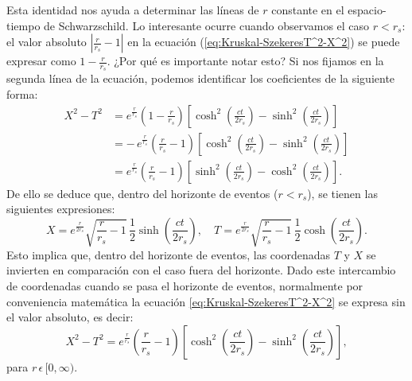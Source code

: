 \noindent
Esta identidad nos ayuda a determinar las líneas de \(r\) constante en el espacio-tiempo de Schwarzschild. Lo interesante ocurre cuando observamos el caso \(r < r_s\): el valor absoluto \(\left|\frac{r}{r_s}-1\right|\) en la ecuación (\ref{eq:Kruskal-SzekeresT^2-X^2}) se puede expresar como \(1-\frac{r}{r_s}\). ¿Por qué es importante notar esto? Si nos fijamos en la segunda línea de la ecuación, podemos identificar los coeficientes de la siguiente forma:
\begin{equation}
    \begin{aligned}
       X^2 -  T^2  &= e^{\frac{r}{r_s}} \left(1-\frac{r}{r_s}\right) \left[ \cosh^2\left(\frac{ct}{2r_s}\right) - \sinh^2\left(\frac{ct}{2r_s}\right) \right] \\
        &= -\, e^{\frac{r}{r_s}} \left(\frac{r}{r_s}-1\right) \left[ \cosh^2\left(\frac{ct}{2r_s}\right) - \sinh^2\left(\frac{ct}{2r_s}\right) \right] \\
        &= e^{\frac{r}{r_s}} \left(\frac{r}{r_s}-1\right) \left[ \sinh^2\left(\frac{ct}{2r_s}\right) - \cosh^2\left(\frac{ct}{2r_s}\right) \right].
    \end{aligned}
\end{equation}
De ello se deduce que, dentro del horizonte de eventos (\(r < r_s\)), se tienen las siguientes expresiones:
\begin{equation}
    X = e^{\frac{r}{2r_s}} \sqrt{\frac{r}{r_s}-1} \, \frac{1}{2} \sinh\left(\frac{ct}{2r_s}\right), \quad 
    T = e^{\frac{r}{2r_s}} \sqrt{\frac{r}{r_s}-1} \, \frac{1}{2} \cosh\left(\frac{ct}{2r_s}\right).
\end{equation}
Esto implica que, dentro del horizonte de eventos, las coordenadas \(T\) y \(X\) se invierten en comparación con el caso fuera del horizonte. Dado este intercambio de coordenadas cuando se pasa el horizonte de eventos, normalmente por conveniencia matemática la ecuación \ref{eq:Kruskal-SzekeresT^2-X^2} se expresa sin el valor absoluto, es decir:
\begin{equation}
    X^2 - T^2 = e^{\frac{r}{r_s}} \left(\frac{r}{r_s}-1\right) \left[ \cosh^2\left(\frac{ct}{2r_s}\right) - \sinh^2\left(\frac{ct}{2r_s}\right) \right],
\end{equation} 
para $r \, \epsilon \, [0,\infty ) $.

